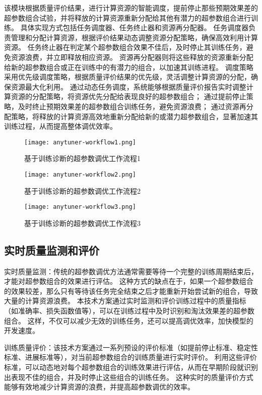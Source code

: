 该模块根据质量评价结果，进行计算资源的智能调度，提前停止那些预期效果差的超参数组合试验，并将释放的计算资源重新分配给其他有潜力的超参数组合进行训练。
具体实现方式包括任务调度器、任务终止器和资源再分配器。
任务调度器负责管理和分配计算资源，根据评价结果动态调整资源分配策略，确保高效利用计算资源。
任务终止器在判定某个超参数组合效果不佳后，及时停止其训练任务，避免资源浪费，并立即释放相应资源。
资源再分配器则将这些释放的资源重新分配给新的超参数组合或正在训练中的有潜力的组合，以加速其训练进程。
调度策略采用优先级调度策略，根据质量评价结果的优先级，灵活调整计算资源的分配，确保资源最大化利用。
通过动态任务调度，系统能够根据质量评价报告实时调整计算资源的分配策略，将资源优先分配给表现良好的超参数组合；
通过提前停止策略，及时终止预期效果差的超参数组合训练任务，避免资源浪费；
通过资源再分配策略，将释放的计算资源高效地重新分配给新的或潜力超参数组合，显著加速其训练过程，从而提高整体调优效率。

\begin{figure}
  \centering
  \texttt{[image: anytuner-workflow1.png]}
  \caption{基于训练诊断的超参数调优工作流程1}
  \label{fig:anytunerworkflow1}
\end{figure}

\begin{figure}
  \centering
  \texttt{[image: anytuner-workflow2.png]}
  \caption{基于训练诊断的超参数调优工作流程2}
  \label{fig:anytunerworkflow2}
\end{figure}

\begin{figure}
  \centering
  \texttt{[image: anytuner-workflow3.png]}
  \caption{基于训练诊断的超参数调优工作流程3}
  \label{fig:anytunerworkflow3}
\end{figure}

\subsection{实时质量监测和评价}

实时质量监测：传统的超参数调优方法通常需要等待一个完整的训练周期结束后，才能对超参数组合的效果进行评估。
这种方式的缺点在于，如果一个超参数组合的效果较差，那么只有等待该任务完全结束之后才能重新开始尝试新的组合，导致大量的计算资源浪费。
本技术方案通过实时监测和评价训练过程中的质量指标（如准确率、损失函数值等），可以在训练过程中及时识别和淘汰效果差的超参数组合。
这样，不仅可以减少无效的训练任务，还可以提高调优效率，加快模型的开发速度。

训练质量评价：该技术方案通过一系列预设的评价标准（如提前停止标准、稳定性标准、进展标准等），对当前超参数组合的训练质量进行实时评价。
利用这些评价标准，可以动态地对每个超参数组合的训练效果进行评估，从而在早期阶段就识别出表现不佳的组合，并及时停止这些组合的训练任务。
这种实时的质量评价方式能够有效地减少计算资源的浪费，并提高超参数调优的效率。

